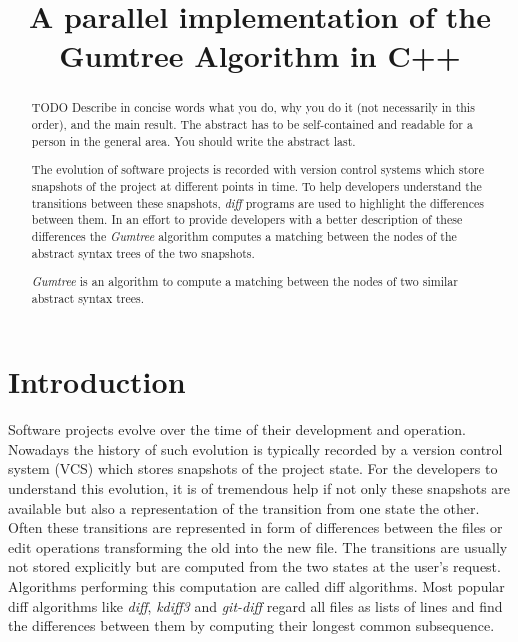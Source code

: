 \documentclass[letterpaper]{article}
\title{A parallel implementation of the Gumtree Algorithm in C++}
\begin{document}
%
\maketitle
%

\begin{abstract}
TODO Describe in concise words what you do, why you do it (not necessarily
in this order), and the main result.  The abstract has to be
self-contained and readable for a person in the general area. You
should write the abstract last.

The evolution of software projects is recorded with version control systems which store snapshots of the project at different points in time. To help developers understand the transitions between these snapshots, \emph{diff} programs are used to highlight the differences between them. In an effort to provide developers with a better description of these differences the \emph{Gumtree} algorithm computes a matching between the nodes of the abstract syntax trees of the two snapshots.

\emph{Gumtree} is an algorithm to compute a matching between the nodes of two similar abstract syntax trees.
\end{abstract}

\section{Introduction}\label{sec:intro}


Software projects evolve over the time of their development and operation.
Nowadays the history of such evolution is typically recorded by a version control system (VCS) which stores snapshots of the project state.
For the developers to understand this evolution, it is of tremendous help if not only these snapshots are available but also a representation of the transition from one state the other.
Often these transitions are represented in form of differences between the files or edit operations transforming the old into the new file.
The transitions are usually not stored explicitly but are computed from the two states at the user's request.
Algorithms performing this computation are called diff algorithms.
Most popular diff algorithms like \emph{diff}, \emph{kdiff3} and \emph{git-diff} regard all files as lists of lines and find the differences between them by computing their longest common subsequence.
\end{document}

